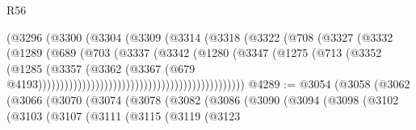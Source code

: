 \begin{lexlean}{R56}
\begin{coremodule}
                                                (@3296
                                                  (@3300
                                                    (@3304
                                                      (@3309
                                                        (@3314
                                                          (@3318
                                                            (@3322
                                                              (@708
                                                                (@3327
                                                                  (@3332
                                                                    (@1289
                                                                      (@689
                                                                        (@703
                                                                          (@3337
                                                                            (@3342
                                                                              (@1280
                                                                                (@3347
                                                                                  (@1275
                                                                                    (@713
                                                                                      (@3352
                                                                                        (@1285
                                                                                          (@3357
                                                                                            (@3362
                                                                                              (@3367
                                                                                                (@679
                                                                                                  @4193)))))))))))))))))))))))))))))))))))))))))))))))
@4289 := @3054
    (@3058
      (@3062
        (@3066
          (@3070
            (@3074
              (@3078
                (@3082
                  (@3086
                    (@3090
                      (@3094
                        (@3098
                          (@3102
                            (@3103
                              (@3107
                                (@3111
                                  (@3115
                                    (@3119
                                      (@3123

\end{coremodule}
\end{lexlean}
